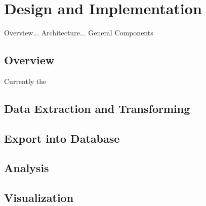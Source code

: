 \chapter{Design and Implementation}
\label{chap:implementation}

Overview... Architecture... General Components

\section{Overview}
Currently the 

\section{Data Extraction and Transforming}

\section{Export into Database}

\section{Analysis}

\section{Visualization}
